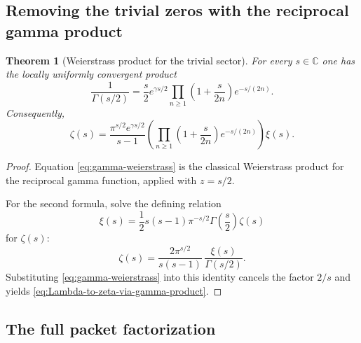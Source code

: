 \documentclass[11pt,a4paper]{article}
\newtheorem{theorem}{Theorem}[section]
\theoremstyle{definition}
\theoremstyle{remark}
\newcommand{\CC}{\mathbb C}
\begin{document}
\subsection{Removing the trivial zeros with the reciprocal gamma product}

\begin{theorem}[Weierstrass product for the trivial sector]\label{thm:gamma-product}
For every $s\in\CC$ one has the locally uniformly convergent product
\begin{equation}\label{eq:gamma-weierstrass}
\frac{1}{\Gamma(s/2)}=\frac{s}{2}e^{\gamma s/2}\prod_{n\ge 1}\left(1+\frac{s}{2n}\right)e^{-s/(2n)}.
\end{equation}
Consequently,
\begin{equation}\label{eq:Lambda-to-zeta-via-gamma-product}
\zeta(s)=\frac{\pi^{s/2}e^{\gamma s/2}}{s-1}\left(\prod_{n\ge 1}\left(1+\frac{s}{2n}\right)e^{-s/(2n)}\right)\xi(s).
\end{equation}
\end{theorem}

\begin{proof}
Equation \eqref{eq:gamma-weierstrass} is the classical Weierstrass product for the reciprocal gamma function, applied with $z=s/2$.

For the second formula, solve the defining relation
\[
\xi(s)=\frac12 s(s-1)\pi^{-s/2}\Gamma\!\left(\frac{s}{2}\right)\zeta(s)
\]
for $\zeta(s)$:
\[
\zeta(s)=\frac{2\pi^{s/2}}{s(s-1)}\,\frac{\xi(s)}{\Gamma(s/2)}.
\]
Substituting \eqref{eq:gamma-weierstrass} into this identity cancels the factor $2/s$ and yields \eqref{eq:Lambda-to-zeta-via-gamma-product}.
\end{proof}

\subsection{The full packet factorization}
\end{document}
